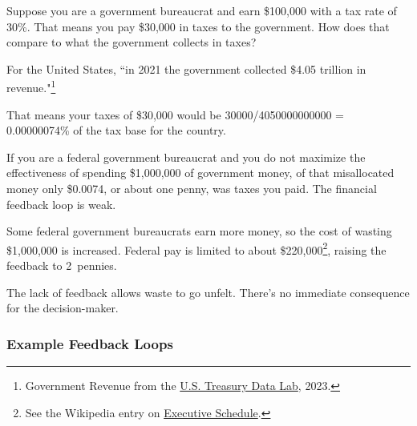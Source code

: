 \begin{mdframed}[frametitle={Taxes and Spending},frametitlerule=true,frametitlealignment=\centering]
Suppose you are a government bureaucrat and earn \$100,000 with a tax rate of 30\%. 
That means you pay \$30,000 in taxes to the government.
How does that compare to what the government collects in taxes?

For the United States, ``in 2021 the government collected \$4.05 trillion in revenue."\footnote{Government Revenue from the \href{https://datalab.usaspending.gov/americas-finance-guide/revenue/}{U.S. Treasury Data Lab}, 2023.}

That means your taxes of \$30,000 would be
30000/4050000000000 = 0.00000074\% of the tax base for the country.

If you are a federal government bureaucrat and you do not maximize the effectiveness of spending \$1,000,000 of government money, of that misallocated money only \$0.0074, or about one penny, was taxes you paid. The financial feedback loop is weak.

Some federal government bureaucrats earn more money, so the cost of wasting \$1,000,000 is increased.
Federal pay is limited to about \$220,000\footnote{See the Wikipedia entry on \href{https://en.wikipedia.org/wiki/Executive_Schedule}{Executive Schedule}.
}, raising the feedback to 2~pennies.
\end{mdframed}

The lack of feedback allows waste to go unfelt. There's no immediate consequence for the decision-maker.



\subsubsection{Example Feedback Loops}



